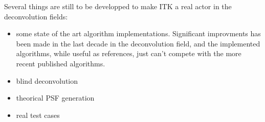 \documentclass{InsightArticle}
\begin{document}
Several things are still to be developped to make ITK a real actor in the deconvolution fields:

\begin{itemize}
 \item some state of the art algorithm implementations. Significant improvments has been made in the last decade
in the deconvolution field, and the implemented algorithms, while useful as references, just can't compete with the
more recent published algorithms.
 \item blind deconvolution
 \item theorical PSF generation
 \item real test cases
\end{itemize}










\appendix





\nocite{ITKSoftwareGuide}
\end{document}
